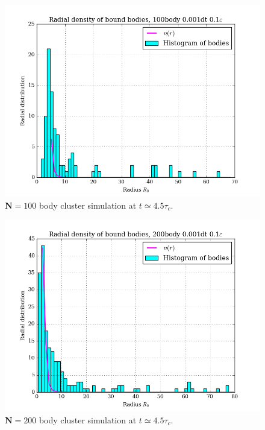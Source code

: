 \documentclass[11pt,a4paper,notitlepage,twocolumn]{article}
\begin{document}
\begin{figure}
[H]\center
\includegraphics[scale=0.35]{../figs/ClusterRadDens_100body_dt1_eps10_dur16.png}
\caption{$\mathbf{N} = 100$ body cluster simulation at $t \simeq 4.5\tau_c$.}\label{fig:N100eps10eqHist}
\end{figure}
\begin{figure}
[H]\center
\includegraphics[scale=0.35]{../figs/ClusterRadDens_200body_dt1_eps10_dur16.png}
\caption{$\mathbf{N} = 200$ body cluster simulation at $t \simeq 4.5\tau_c$.}\label{fig:N200eps10eqHist}
\end{figure}
\end{document}
